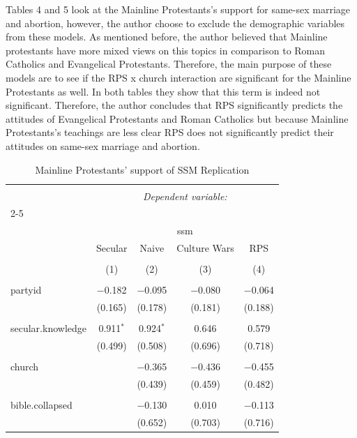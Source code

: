 \documentclass[12pt,letterpaper]{article}
\begin{document}
\begin{description}
\item Tables 4 and 5 look at the Mainline Protestants's support for same-sex marriage and abortion, however, the author choose to exclude the demographic variables from these models. As mentioned before, the author believed that Mainline protestants have more mixed views on this topics in comparison to Roman Catholics and Evangelical Protestants. Therefore, the main purpose of these models are to see if the RPS x church interaction are significant for the Mainline Protestants as well. In both tables they show that this term is indeed not significant. Therefore, the author concludes that RPS significantly predicts the attitudes of Evangelical Protestants and Roman Catholics but because Mainline Protestants's teachings are less clear RPS does not significantly predict their attitudes on same-sex marriage and abortion. 
\begin{table}[H] \centering 
	\caption{Mainline Protestants' support of SSM Replication} 
	\label{} 
	\scriptsize 
	\begin{tabular}{@{\extracolsep{5pt}}lcccc} 
		\\[-1.8ex]\hline 
		\hline \\[-1.8ex] 
		& \multicolumn{4}{c}{\textit{Dependent variable:}} \\ 
		\cline{2-5} 
		\\[-1.8ex] & \multicolumn{4}{c}{ssm} \\ 
		& Secular & Naive & Culture Wars & RPS \\ 
		\\[-1.8ex] & (1) & (2) & (3) & (4)\\ 
		\hline \\[-1.8ex] 
		partyid & $-$0.182 & $-$0.095 & $-$0.080 & $-$0.064 \\ 
		& (0.165) & (0.178) & (0.181) & (0.188) \\ 
		& & & & \\ 
		secular.knowledge & 0.911$^{*}$ & 0.924$^{*}$ & 0.646 & 0.579 \\ 
		& (0.499) & (0.508) & (0.696) & (0.718) \\ 
		& & & & \\ 
		church &  & $-$0.365 & $-$0.436 & $-$0.455 \\ 
		&  & (0.439) & (0.459) & (0.482) \\ 
		& & & & \\ 
		bible.collapsed &  & $-$0.130 & 0.010 & $-$0.113 \\ 
		&  & (0.652) & (0.703) & (0.716) \\ 

\end{tabular}
\end{table}
\end{description}
\end{document}
